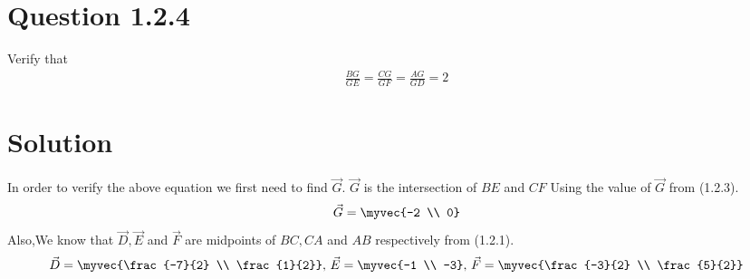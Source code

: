 \documentclass[journal,12pt,twocolumn]{IEEEtran}
\theoremstyle{remark}
\begin{document}
\section{Question 1.2.4}Verify that 
\begin{align}
		\frac{BG}{GE} = 
		\frac{CG}{GF} =
		\frac{AG}{GD} = 2 
\end{align}
\section{Solution}In order to verify the above equation we first need to find $\vec{G}$. 
$\vec{G}$ is the intersection of $BE$ and $CF$
Using the value of $\vec{G}$ from (1.2.3).
\begin{align}
		\vec{G} = \myvec{-2 \\ 0}
\end{align}
Also,We know that $\vec{D}, \vec{E}$ and $\vec{F}$ are midpoints of $BC, CA$ and $AB$ respectively from (1.2.1).
\begin{align}
		\vec{D} = \myvec{\frac{-7}{2} \\ \frac{1}{2}},\,
		\vec{E} = \myvec{-1 \\ -3},\,
		\vec{F} = \myvec{\frac{-3}{2} \\ \frac{5}{2}}
\end{align}
\end{document}
